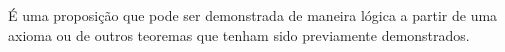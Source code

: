 \documentclass[../../main]{subfiles}
\begin{document}
    \begin{defi}[Teorema]\label{defi:teorema}
        É uma proposição que pode ser demonstrada de maneira lógica a partir de uma axioma ou de outros teoremas que tenham sido previamente demonstrados.
    \end{defi}
\end{document}

